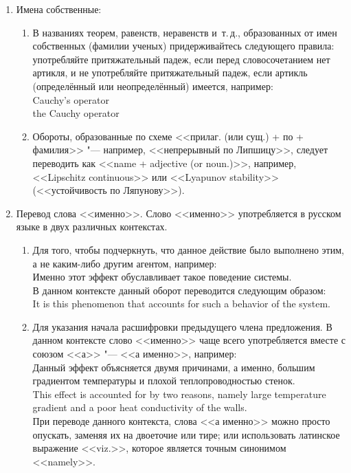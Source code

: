 \documentclass[a5paper, 10pt, twoside, numbers=enddot]{scrartcl}
\newcommand{\etc}{и~т.\,д.\xspace}
\begin{document}
\begin{enumerate}
  \item Имена собственные:
    \begin{enumerate}
      \item В названиях теорем, равенств, неравенств \etc, образованных от имен собственных (фамилии
        ученых) придерживайтесь следующего правила: употребляйте притяжательный падеж, если перед
        словосочетанием нет артикля, и не употребляйте притяжательный падеж, если артикль
        (определённый или неопределённый) имеется, например:\\ [4pt]
        \textsf{
          Cauchy's operator\\
          the Cauchy operator
        }

      \item Обороты, образованные по схеме <<прилаг. (или сущ.) + по + фамилия>> "--- например,
        <<непрерывный по Липшицу>>, следует переводить как <<name + adjective (or noun.)>>,
        например, <<Lipschitz continuous>> или <<Lyapunov stability>> (<<устойчивость по
        Ляпунову>>).
    \end{enumerate}

  \item Перевод слова <<именно>>. Слово <<именно>> употребляется в русском языке в двух различных
    контекстах.
    \begin{enumerate}
      \item Для того, чтобы подчеркнуть, что данное действие было выполнено этим, а не каким-либо
        другим агентом, например:\\ [4pt]
        \textsf{Именно этот эффект обуславливает такое поведение системы.}\\ [4pt]
        В данном контексте данный оборот переводится следующим образом:\\ [4pt]
        \textsf{It is this phenomenon that accounts for such a behavior of the system.}

      \item Для указания начала расшифровки предыдущего члена предложения. В данном контексте слово
        <<именно>> чаще всего употребляется вместе с союзом <<а>> "--- <<а именно>>, например:\\ [4pt]
        \textsf{
          Данный эффект объясняется двумя причинами, а именно, большим градиентом температуры и
          плохой теплопроводностью стенок.\\
          This effect is accounted for by two reasons, namely large temperature gradient and a poor
          heat conductivity of the walls.\\ [4pt]
        }
        При переводе данного контекста, слова <<а именно>> можно просто опускать, заменяя их на
        двоеточие или тире; или использовать латинское выражение <<viz.>>, которое является точным
        синонимом <<namely>>.
    \end{enumerate}


\end{enumerate}
\end{document}
